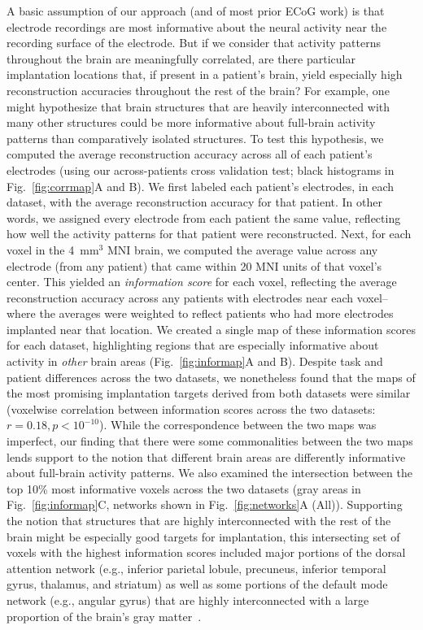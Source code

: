 \documentclass[11pt]{article}
\begin{document}
A basic assumption of our approach (and
of most prior ECoG work) is that electrode recordings are most
informative about the neural activity near the recording surface of
the electrode.  But if we consider that activity patterns throughout
the brain are meaningfully correlated, are there particular
implantation locations that, if present in a patient's brain, yield
especially high reconstruction accuracies throughout the rest of the
brain?  For example, one might hypothesize that brain structures that
are heavily interconnected with many other structures could be more
informative about full-brain activity patterns than comparatively
isolated structures.  To test this hypothesis, we computed the average reconstruction
accuracy across all of each patient's electrodes (using our
across-patients cross validation test; black histograms in
Fig.~\ref{fig:corrmap}A and B).  We first labeled each patient's electrodes,
in each dataset, with the average reconstruction accuracy for that
patient.  In other words, we assigned every electrode from each
patient the same value, reflecting how well the activity patterns for that patient were reconstructed.  Next, for each voxel
in the 4~mm$^3$ MNI brain, we computed the average value across any
electrode (from any patient) that came within 20 MNI units of that
voxel's center.  This yielded an \textit{information
  score} for each voxel, reflecting the average reconstruction
accuracy across any patients with electrodes near each voxel-- where
the averages were weighted to reflect patients who had more electrodes
implanted near that location. We created a single map of these information scores for each
dataset, highlighting regions that are especially informative about activity in \textit{other} brain areas
(Fig.~\ref{fig:informap}A and B).  Despite task
and patient differences across the two datasets, we nonetheless found
that the maps of the most promising implantation targets derived from
both datasets were similar (voxelwise correlation between information
scores across the two datasets: $r = 0.18, p < 10^{-10}$).  While the
correspondence between the two maps was imperfect, our finding that
there were some commonalities between the two maps lends support to
the notion that different brain areas are differently informative
about full-brain activity patterns.  We also examined the intersection
between the top 10\% most informative voxels across the two datasets
(gray areas in Fig.~\ref{fig:informap}C, networks shown in
Fig.~\ref{fig:networks}A (All)).
Supporting the notion that structures that are highly interconnected
with the rest of the brain might be especially good targets for
implantation, this intersecting set of voxels with the highest
information scores included major portions of the dorsal attention
network (e.g., inferior parietal lobule, precuneus, inferior temporal
gyrus, thalamus, and striatum) as well as some portions of the default
mode network (e.g., angular gyrus) that are highly interconnected with
a large proportion of the brain's gray matter~\citep[e.g., ][]{TomaVolk11}.
\end{document}
